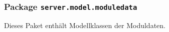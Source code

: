 \FloatBarrier
\subsubsection[Package server.model.moduledata]{Package \texttt{server.model.moduledata}}
Dieses Paket enthält Modellklassen der Moduldaten.



       